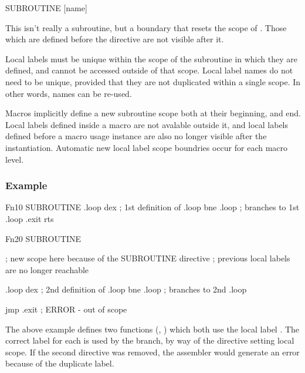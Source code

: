\begin{usage}
  SUBROUTINE [name]
\end{usage}

This isn't really a subroutine, but a boundary that resets the scope of . Those which are defined before the  directive are not visible after it.

Local labels must be unique within the scope of the subroutine in which they are defined, and cannot be accessed outside of that scope. Local label names do not need to be unique, provided that they are not duplicated within a single scope. In other words, names can be re-used.

Macros implicitly define a new subroutine scope both at their beginning, and end. Local labels defined inside a macro are not avalable outside it, and local labels defined before a macro usage instance are also no longer visible after the instantiation. Automatic new local label scope boundries occur for each macro level.


\subsubsection{Example}

\begin{code}
Fn10
            SUBROUTINE
.loop       dex           ; 1st definition of .loop
            bne .loop     ; branches to 1st .loop
.exit       rts

Fn20        SUBROUTINE

  ; new scope here because of the SUBROUTINE directive
  ; previous local labels are no longer reachable

.loop       dex           ; 2nd definition of .loop
            bne .loop     ; branches to 2nd .loop
            
            jmp .exit     ; ERROR - out of scope
            
\end{code}

The above example defines two functions (, ) which both use the local label . The correct label for each is used by the branch, by way of the  directive  setting local scope.  If the second  directive  was removed, the assembler would generate an error because of the duplicate label.

